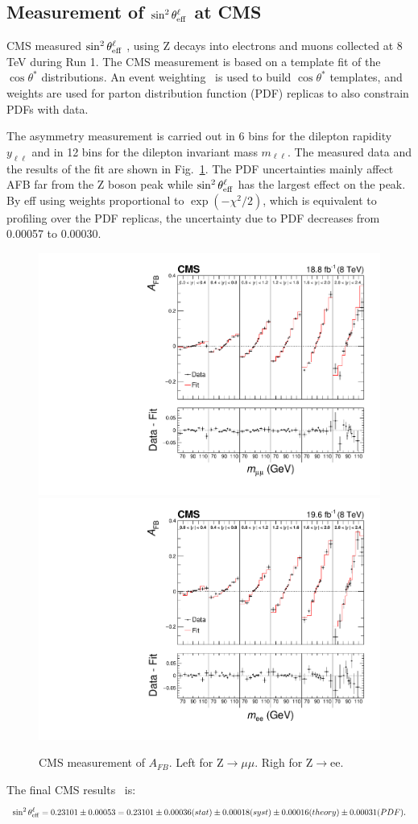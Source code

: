 \documentclass{moriond}
\def\stl{\sin^2\theta^\ell_{\rm eff}}
\begin{document}
\subsection{Measurement of $\stl$ at CMS}
\label{sec:stwcms}
CMS measured $\stl$ , using Z decays into electrons and muons
collected at 8 TeV during Run 1. The CMS measurement is based on a
template fit of the $\cos\theta^*$ distributions.  An event
weighting~\cite{Bodek:2010qg} is used to build $\cos\theta^*$
templates, and weights are used for parton distribution function (PDF)
replicas to also constrain PDFs with data.

The asymmetry measurement is carried out in 6 bins for the dilepton
rapidity $y_{\ell\ell}$ and in 12 bins for the dilepton invariant mass
$m_{\ell\ell}$. The measured data and the results of the fit are shown
in Fig.~\ref{fig:afbcms}. The PDF uncertainties mainly affect AFB far
from the Z boson peak while $\stl$ has the largest effect on the
peak. By eff using weights proportional to $\exp(-\chi^2/2)$, which is
equivalent to profiling over the PDF replicas, the uncertainty due to
PDF decreases from 0.00057 to 0.00030.
%
\begin{figure}[!htbp]
  \centerline{
    \includegraphics[width=0.35\linewidth,draft=false]{Fig2a.pdf}
    \includegraphics[width=0.35\linewidth,draft=false]{Fig2b.pdf}
  }
  \caption[]{
    CMS measurement of $A_{FB}$. Left for Z$\to\mu\mu$. Righ for Z$\to$ee.
    \label{fig:afbcms}}
\end{figure}
%
The final CMS results~\cite{Sirunyan:2018swq} is:
\begin{equation*}
\stl = 0.23101 \pm 0.00053 = 0.23101 \pm 0.00036(stat) \pm 0.00018(syst) \pm 0.00016(theory) \pm 0.00031(PDF).
\end{equation*}
\end{document}
